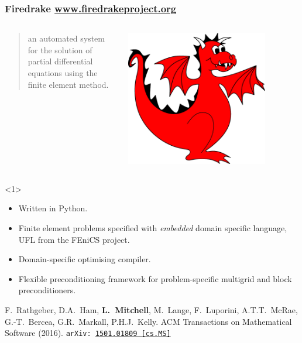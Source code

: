 \documentclass[presentation,aspectratio=43, 10pt]{beamer}
\newcommand{\arxivlink}[2]{{\texttt{arXiv:\,\href{https://arxiv.org/abs/#1}{#1\,[#2]}}}}
\begin{document}
\begin{frame}
  \frametitle{Firedrake \url{www.firedrakeproject.org}}
  \begin{columns}
    \begin{column}{0.8\textwidth}
      \begin{quote}
        {\normalfont [\ldots]} an automated system for the solution of
        partial differential equations using the finite element
        method.
      \end{quote}
    \end{column}
    \begin{column}{0.2\textwidth}
      \includegraphics[width=0.8\textwidth]{firedrake}
    \end{column}
  \end{columns}
  \begin{overlayarea}{\textwidth}{0.6\textheight}
    \begin{onlyenv}<1>
      \begin{itemize}
      \item Written in Python.
      \item Finite element problems specified with \emph{embedded}
        domain specific language, UFL from the FEniCS project.
      \item Domain-specific optimising compiler.
      \item Flexible preconditioning framework for problem-specific multigrid and block preconditioners.
      \end{itemize}
      \begin{flushright}
        {\scriptsize F.~Rathgeber, D.A.~Ham, \textbf{L.~Mitchell}, M.~Lange,
        F.~Luporini, A.T.T.~McRae, G.-T.~Bercea, G.R.~Markall,
        P.H.J.~Kelly. ACM Transactions on Mathematical Software
        (2016). \arxivlink{1501.01809}{cs.MS}\nocite{Rathgeber:2016}

}
\end{flushright}
\end{onlyenv}
\end{overlayarea}
\end{frame}
\end{document}
